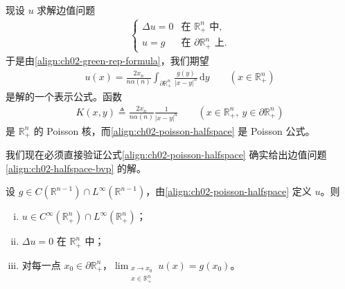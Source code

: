 \documentclass[../../main.tex]{subfiles}
\begin{document}
现设 $u$ 求解边值问题
\begin{align}\label{align:ch02-halfspace-bvp}
\begin{cases}
\Delta u=0 & \text{在 }\mathbb{R}^n_+\text{ 中},\\
u=g & \text{在 }\partial\mathbb{R}^n_+\text{ 上}.
\end{cases}
\end{align}
于是由\eqref{align:ch02-green-rep-formula}，我们期望
\begin{align}\label{align:ch02-poisson-halfspace}
u(x)=\frac{2x_n}{n\alpha(n)}\int_{\partial\mathbb{R}^n_+}\frac{g(y)}{|x-y|^n}\,\mathrm{d}y \qquad (x\in\mathbb{R}^n_+)
\end{align}
是解的一个表示公式。函数
\begin{align*}
K(x,y)\triangleq\frac{2x_n}{n\alpha(n)}\frac{1}{|x-y|^n} \qquad (x\in\mathbb{R}^n_+,\ y\in\partial\mathbb{R}^n_+)
\end{align*}
是 $\mathbb{R}^n_+$ 的 Poisson 核，而\eqref{align:ch02-poisson-halfspace} 是 Poisson 公式。

我们现在必须直接验证公式\eqref{align:ch02-poisson-halfspace} 确实给出边值问题\eqref{align:ch02-halfspace-bvp} 的解。

\begin{theorem}\label{theorem:ch02-poisson-halfspace}设 $g\in C(\mathbb{R}^{n-1})\cap L^\infty(\mathbb{R}^{n-1})$，由\eqref{align:ch02-poisson-halfspace} 定义 $u$。则
\begin{enumerate}[(i)]
\item $u\in C^\infty(\mathbb{R}^n_+)\cap L^\infty(\mathbb{R}^n_+)$；
\item $\Delta u=0$ 在 $\mathbb{R}^n_+$ 中；
\item 对每一点 $x_0\in\partial\mathbb{R}^n_+$，$\displaystyle\lim_{\substack{x\to x_0\\ x\in\mathbb{R}^n_+}}u(x)=g(x_0)$。
\end{enumerate}
\end{theorem}
\end{document}
